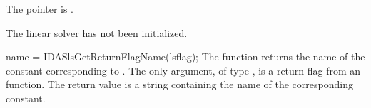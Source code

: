 {{\begin{args}
  \item[\Id{IDASLS\_MEM\_NULL}]
    The  pointer is .
  \item[\Id{IDASLS\_LMEM\_NULL}]
    The {\idasls} linear solver has not been initialized.
  \end{args}
}
{
}
{
  name = IDASlsGetReturnFlagName(lsflag);
}
{
  The function  returns the
  name of the {\idasls} constant corresponding to .
}
{
  The only argument, of type , is a return flag from an {\idasls} function.
}
{
  The return value is a string containing the name of the corresponding constant.
}
{}

%
%
}
